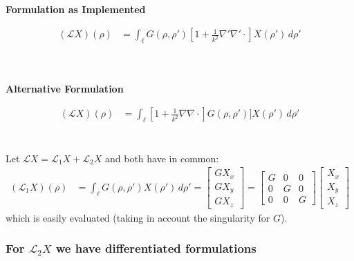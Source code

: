 \documentclass{article}
\newcommand{\0}{\varnothing}
\begin{document}
\begin{minipage}{0.45\textwidth}
\ \\
\begin{center}  \bf Formulation as Implemented\end{center}
\begin{align*}
    (\mathcal{L}X)(\rho) &= \int_{\ell}G(\rho,\rho')[1+\frac{1}{k^2}\nabla'\nabla'\cdotp]X(\rho') \,d\rho'\\
\end{align*}
\end{minipage}
\begin{minipage}{0.45\textwidth}
\ \\
\begin{center}  \bf Alternative Formulation \end{center}
\begin{align*}
    (\mathcal{L}X)(\rho) &= \int_{\ell}[1+\frac{1}{k^2}\nabla\nabla\cdotp]G(\rho,\rho')]X(\rho') \,d\rho'\\
\end{align*}
\end{minipage}
\ \\
Let $\mathcal{L}X = \mathcal{L}_1 X + \mathcal{L}_2 X$ and both have in common:
\begin{align*}
    (\mathcal{L}_1 X)(\rho) &= \int_{\ell}G(\rho,\rho') X(\rho') \,d\rho' = 
    \left[ \begin{array}{c} G X_x\\ G X_y \\ G X_z  \end{array} \right] = \left[ \begin{array}{ccc} G & 0 & 0 \\ 
                            0 & G & 0\\ 
                            0 & 0 & G \end{array} \right]
        \left[ \begin{array}{c} 
        X_x \\ X_y \\ X_z \end{array} \right]
\end{align*}
which is easily evaluated (taking in account the singularity for $G$).
\ \\

\subsubsection{For $\mathcal{L}_2 X$ we have differentiated formulations}
\end{document}
